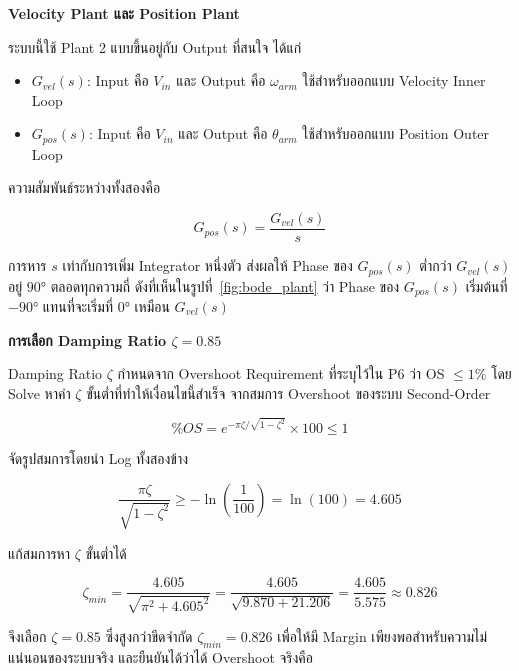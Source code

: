 \textbf{Velocity Plant และ Position Plant}

ระบบนี้ใช้ Plant 2 แบบขึ้นอยู่กับ Output ที่สนใจ ได้แก่

\begin{itemize}
  \item $G_{vel}(s)$: Input คือ $V_{in}$ และ Output คือ $\omega_{arm}$ 
        ใช้สำหรับออกแบบ Velocity Inner Loop
  \item $G_{pos}(s)$: Input คือ $V_{in}$ และ Output คือ $\theta_{arm}$ 
        ใช้สำหรับออกแบบ Position Outer Loop
\end{itemize}

ความสัมพันธ์ระหว่างทั้งสองคือ

\begin{equation}
  G_{pos}(s) = \frac{G_{vel}(s)}{s}
  \label{eq:gpos_gvel}
\end{equation}

การหาร $s$ เท่ากับการเพิ่ม Integrator หนึ่งตัว ส่งผลให้ Phase ของ 
$G_{pos}(s)$ ต่ำกว่า $G_{vel}(s)$ อยู่ $90°$ ตลอดทุกความถี่
ดังที่เห็นในรูปที่~\ref{fig:bode_plant} ว่า Phase ของ $G_{pos}(s)$ 
เริ่มต้นที่ $-90°$ แทนที่จะเริ่มที่ $0°$ เหมือน $G_{vel}(s)$

\textbf{การเลือก Damping Ratio $\zeta = 0.85$}

Damping Ratio $\zeta$ กำหนดจาก Overshoot Requirement ที่ระบุไว้ใน P6 
ว่า OS $\leq 1\%$ โดย Solve หาค่า $\zeta$ ขั้นต่ำที่ทำให้เงื่อนไขนี้สำเร็จ
จากสมการ Overshoot ของระบบ Second-Order

\begin{equation}
  \%OS = e^{-\pi\zeta/\sqrt{1-\zeta^2}} \times 100 \leq 1
  \label{eq:os_requirement}
\end{equation}

จัดรูปสมการโดยนำ Log ทั้งสองข้าง

\begin{equation}
  \frac{\pi\zeta}{\sqrt{1-\zeta^2}} \geq -\ln\!\left(\frac{1}{100}\right) 
  = \ln(100) = 4.605
  \label{eq:os_log}
\end{equation}

แก้สมการหา $\zeta$ ขั้นต่ำได้

\begin{equation}
  \zeta_{min} = \frac{4.605}{\sqrt{\pi^2 + 4.605^2}} 
              = \frac{4.605}{\sqrt{9.870 + 21.206}} 
              = \frac{4.605}{5.575} 
              \approx 0.826
  \label{eq:zeta_min}
\end{equation}

จึงเลือก $\zeta = 0.85$ ซึ่งสูงกว่าขีดจำกัด $\zeta_{min} = 0.826$ 
เพื่อให้มี Margin เพียงพอสำหรับความไม่แน่นอนของระบบจริง
และยืนยันได้ว่าได้ Overshoot จริงคือ

